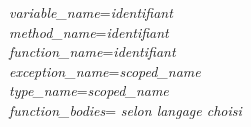 \begin{tabbing}
\emph{variable\_name}\>\twocol=\>\emph{identifiant}\\

\emph{method\_name}\>\twocol=\>\emph{identifiant}\\

\emph{function\_name}\>\twocol=\>\emph{identifiant}\\

\emph{exception\_name}\>\twocol=\>\emph{scoped\_name}\\

\emph{type\_name}\>\twocol=\>\emph{scoped\_name}\\

\emph{function\_bodies}\>\twocol=\> \emph{selon langage choisi}\\
\end{tabbing}


